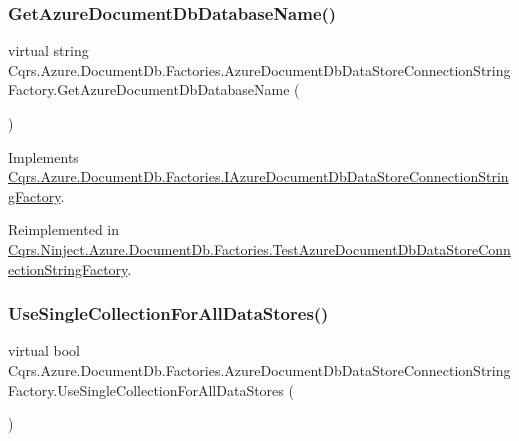 \subsubsection{\texorpdfstring{Get\+Azure\+Document\+Db\+Database\+Name()}{GetAzureDocumentDbDatabaseName()}}
{\footnotesize\ttfamily virtual string Cqrs.\+Azure.\+Document\+Db.\+Factories.\+Azure\+Document\+Db\+Data\+Store\+Connection\+String\+Factory.\+Get\+Azure\+Document\+Db\+Database\+Name (\begin{DoxyParamCaption}{ }\end{DoxyParamCaption})\hspace{0.3cm}{\ttfamily [virtual]}}



Implements \hyperlink{interfaceCqrs_1_1Azure_1_1DocumentDb_1_1Factories_1_1IAzureDocumentDbDataStoreConnectionStringFactory_aa5e3d0920e86a97aef18f4f215ce4f88_aa5e3d0920e86a97aef18f4f215ce4f88}{Cqrs.\+Azure.\+Document\+Db.\+Factories.\+I\+Azure\+Document\+Db\+Data\+Store\+Connection\+String\+Factory}.



Reimplemented in \hyperlink{classCqrs_1_1Ninject_1_1Azure_1_1DocumentDb_1_1Factories_1_1TestAzureDocumentDbDataStoreConnectionStringFactory_ab4b864396b790819609d3337dfb3f75d_ab4b864396b790819609d3337dfb3f75d}{Cqrs.\+Ninject.\+Azure.\+Document\+Db.\+Factories.\+Test\+Azure\+Document\+Db\+Data\+Store\+Connection\+String\+Factory}.

\mbox{\label{classCqrs_1_1Azure_1_1DocumentDb_1_1Factories_1_1AzureDocumentDbDataStoreConnectionStringFactory_aa7b4b3eca609a815358af227b0f53909_aa7b4b3eca609a815358af227b0f53909}} 
\subsubsection{\texorpdfstring{Use\+Single\+Collection\+For\+All\+Data\+Stores()}{UseSingleCollectionForAllDataStores()}}
{\footnotesize\ttfamily virtual bool Cqrs.\+Azure.\+Document\+Db.\+Factories.\+Azure\+Document\+Db\+Data\+Store\+Connection\+String\+Factory.\+Use\+Single\+Collection\+For\+All\+Data\+Stores (\begin{DoxyParamCaption}{ }\end{DoxyParamCaption})\hspace{0.3cm}{\ttfamily [virtual]}}



